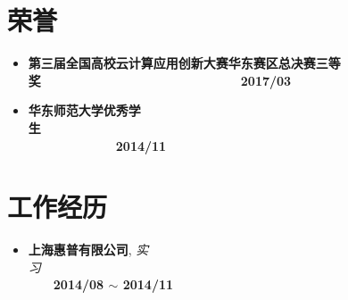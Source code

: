 \documentclass[letterpaper, UTF8, 11pt]{article}
\begin{document}
	\section*{\textbf{荣誉}}\vspace{-0.15in}
	\begin{itemize}
		\item \textbf{第三届全国高校云计算应用创新大赛华东赛区总决赛三等奖}~~~~~~~~~~~~~~~~~~~~~~~~~~~~~~~~\textbf{2017/03}
		\item \textbf{华东师范大学优秀学生}~~~~~~~~~~~~~~~~~~~~~~~~~~~~~~~~~~~~~~~~~~~~~~~~~~~~~~~~~~~~~~~~~~~~~~~~~~~~~~~~\textbf{2014/11}
	\end{itemize}
	\vspace{-0.3in}
	
	\section*{\textbf{工作经历}}\vspace{-0.15in}
	\begin{itemize}
		\item \textbf{上海惠普有限公司}, \emph{实习}~~~~~~~~~~~~~~~~~~~~~~~~~~~~~~~~~~~~~~~~~~~~~~~~~~~~~~~~~~~~~~~~~~~~~~\textbf{2014/08 $\sim$ 2014/11}
	\end{itemize}
	\vspace{-0.3in}
	
\end{document}
